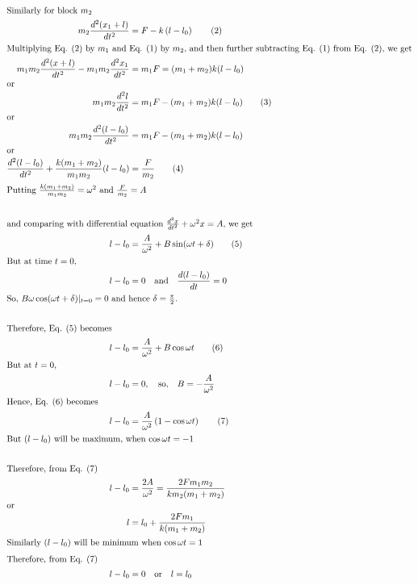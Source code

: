 \begin{solution}
\begin{align*}
        \intertext{Similarly for block \(m_{2}\)}
        m_{2} \frac{d^{2} (x_{1} + l)}{dt^{2}} &= F - k \left( l - l_{0} \right) \tag{2}\\
        \intertext{Multiplying Eq. (2) by \(m_1\) and Eq. (1) by \(m_2\), and then further subtracting Eq. (1) from Eq. (2), we get}
        m_{1}m_{2} \frac{d^{2} (x + l)}{dt^{2}} - m_{1}m_{2} \frac{d^{2} x_{1}}{dt^{2}} &= m_{1}F = (m_{1} + m_{2})k (l - l_{0})\\
        \intertext{or}
        m_{1} m_{2} \frac{d^{2} l}{dt^{2}} &= m_{1}F - (m_{1} + m_{2}) k (l - l_{0}) \tag{3}\\
        \intertext{or}
        m_{1} m_{2} \frac{d^{2} (l - l_{0})}{dt^{2}} &= m_{1}F - (m_{1} + m_{2}) k (l - l_{0})\\
        \intertext{or}
        \frac{d^{2} (l - l_{0})}{dt^{2}} + \frac{k (m_{1} + m_{2})}{m_{1} m_{2}} (l - l_{0}) &= \frac{F}{m_{2}} \tag{4}\\
        \intertext{Putting \(\frac{k (m_{1} + m_{2})}{m_{1} m_{2}} = \omega^{2}\) and \(\frac{F}{m_{2}} = A\)}\\
        \intertext{and comparing with differential equation \(\frac{d^{2}x}{dt^{2}} + \omega^{2}x = A\), we get}
        l - l_{0} &= \frac{A}{\omega^{2}} + B \sin (\omega t + \delta ) \tag{5}\\
        \intertext{But at time \(t = 0\),}
        l - l_{0} &= 0 \quad \text{and} \quad \frac{d (l - l_{0})}{dt} = 0\\
        \intertext{So, \( B \omega \cos (\omega t + \delta) \vert_{t=0} = 0 \) and hence \(\delta = \frac{\pi}{2} \).}\\
        \intertext{Therefore, Eq. (5) becomes}
        l - l_{0} &= \frac{A}{\omega^{2}} + B \cos \omega t \tag{6}\\
        \intertext{But at \(t = 0\),}
        l - l_{0} &= 0, \quad \text{so,} \quad B = -\frac{A}{\omega^{2}}\\
        \intertext{Hence, Eq. (6) becomes}
        l - l_{0} &= \frac{A}{\omega^{2}} \left( 1 - \cos \omega t \right) \tag{7}\\
        \intertext{But \((l - l_{0})\) will be maximum, when \(\cos \omega t = -1\)}\\
        \intertext{Therefore, from Eq. (7)}
        l - l_{0} &= \frac{2A}{\omega^{2}} = \frac{2Fm_{1}m_{2}}{km_{2} (m_{1} + m_{2})}\\
        \intertext{or}
        l &= l_{0} + \frac{2Fm_{1}}{k(m_{1} + m_{2})}\\
        \intertext{Similarly \((l - l_{0})\) will be minimum when \(\cos \omega t = 1\)}
        \intertext{Therefore, from Eq. (7)}
        l - l_{0} &= 0 \quad \text{or} \quad l = l_{0}
    \end{align*}
\end{solution}